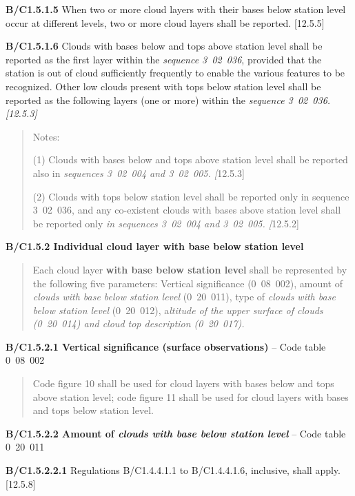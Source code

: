 \textbf{B/C1.5.1.5} When two or more cloud layers with their bases below station level occur at different levels, two or more cloud layers shall be reported. {[}12.5.5{]}

\textbf{B/C1.5.1.6} Clouds with bases below and tops above station level shall be reported as the first layer within the \emph{sequence 3~02~036}, provided that the station is out of cloud sufficiently frequently to enable the various features to be recognized. Other low clouds present with tops below station level shall be reported as the following layers (one or more) within the \emph{sequence 3~02~036.} \emph{{[}12.5.3{]}}

\begin{quote}
Notes:

(1) Clouds with bases below and tops above station level shall be reported also in \emph{sequences 3~02~004 and 3~02~005. {[}}12.5.3{]}

(2) Clouds with tops below station level shall be reported only in sequence 3\emph{~}02\emph{~}036, and any co-existent clouds with bases above station level shall be reported only \emph{in sequences 3~02~004 and 3~02~005. {[}}12.5.2{]}
\end{quote}

\textbf{B/C1.5.2 Individual cloud layer with base below station level}

\begin{quote}
Each cloud layer \textbf{with base below station level} shall be represented by the following five parameters: Vertical significance (0\emph{~}08~002), amount of \emph{clouds with base below station level} (0\emph{~}20~011), type of \emph{clouds with base below station level} (0\emph{~}20~012), a\emph{ltitude of the upper surface of clouds (0~20~014) and cloud top description (0~20~017).}
\end{quote}

\textbf{B/C1.5.2.1 Vertical significance (surface observations)} -- Code table 0\emph{~}08\emph{~}002

\begin{quote}
Code figure 10 shall be used for cloud layers with bases below and tops above station level; code figure 11 shall be used for cloud layers with bases and tops below station level.
\end{quote}

\textbf{B/C1.5.2.2 Amount of \emph{clouds with base below station level}} -- Code table 0\emph{~}20\emph{~}011

\textbf{B/C1.5.2.2.1} Regulations B/C1.4.4.1.1 to B/C1.4.4.1.6, inclusive, shall apply. {[}12.5.8{]}

